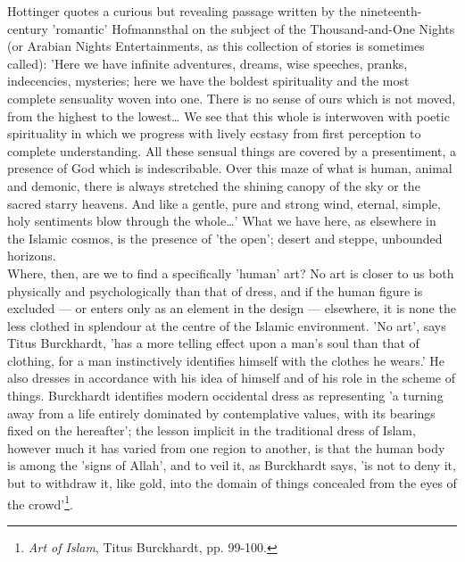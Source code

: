\documentclass[11pt, b5paper, twoside]{book}
\begin{document}
Hottinger quotes a curious but revealing passage written by the nineteenth\hyp{}century 'romantic' 
Hofmannsthal on the subject of the Thousand-and-One Nights (or Arabian Nights Entertainments, as this 
collection of stories is sometimes called): 'Here we have infinite adventures, dreams, wise speeches, 
pranks, indecencies, mysteries; here we have the boldest spirituality and the most complete 
sensuality woven into one. There is no sense of ours which is not moved, from the highest to the 
lowest\ldots{} We see that this whole is interwoven with poetic spirituality in which we progress with 
lively ecstasy from first perception to complete understanding. All these sensual things are covered 
by a presentiment, a presence of God which is indescribable. Over this maze of what is human, animal 
and demonic, there is always stretched the shining canopy of the sky or the sacred starry heavens. 
And like a gentle, pure and strong wind, eternal, simple, holy sentiments blow through the whole\ldots{}' 
What we have here, as elsewhere in the Islamic cosmos, is the presence of 'the open'; desert and 
steppe, unbounded horizons. \\

Where, then, are we to find a specifically 'human' art? No art is closer to us both physically and 
psychologically than that of dress, and if the human figure is excluded --- or enters only as an 
element in the design --- elsewhere, it is none the less clothed in splendour at the centre of the 
Islamic environment. 'No art', says Titus Burckhardt, 'has a more telling effect upon a man's soul 
than that of clothing, for a man instinctively identifies himself with the clothes he wears.' He also 
dresses in accordance with his idea of himself and of his role in the scheme of things. Burckhardt 
identifies modern occidental dress as representing 'a turning away from a life entirely dominated by 
contemplative values, with its bearings fixed on the hereafter'; the lesson implicit in the 
traditional dress of Islam, however much it has varied from one region to another, is that the human 
body is among the 'signs of Allah', and to veil it, as Burckhardt says, 'is not to deny it, but to 
withdraw it, like gold, into the domain of things concealed from the eyes of the crowd'\footnote{\emph{Art of Islam}, Titus Burckhardt, pp. 99-100.}. \\
\end{document}

